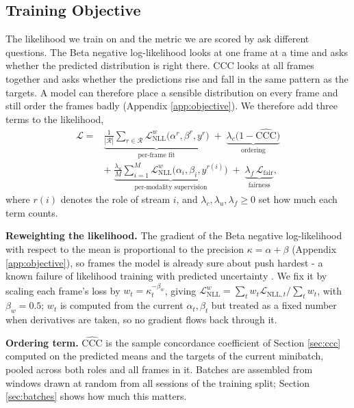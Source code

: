 \documentclass[10pt,a4paper,twocolumn]{article}
\begin{document}
	\subsection{Training Objective}
	\label{sec:objective}
	
	The likelihood we train on and the metric we are scored by ask different questions. The Beta negative log-likelihood looks at one frame at a time and asks whether the predicted distribution is right there. CCC looks at all frames together and asks whether the predictions rise and fall in the same pattern as the targets. A model can therefore place a sensible distribution on every frame and still order the frames badly (Appendix \ref{app:objective}). We therefore add three terms to the likelihood,
	$$\begin{aligned}\mathcal{L} = {}&\underbrace{\frac{1}{|\mathcal{R}|}\sum_{r \in \mathcal{R}} \mathcal{L}_{\text{NLL}}^{w}\bigl(\alpha^{r}, \beta^{r}, y^{r}\bigr)}_{\text{per-frame fit}} \;+\; \underbrace{\lambda_c\bigl(1 - \widehat{\text{CCC}}\bigr)}_{\text{ordering}} \\ &+\; \underbrace{\frac{\lambda_u}{M}\sum_{i=1}^{M} \mathcal{L}_{\text{NLL}}^{w}\bigl(\alpha_i, \beta_i, y^{r(i)}\bigr)}_{\text{per-modality supervision}} \;+\; \underbrace{\lambda_f\,\mathcal{L}_{\text{fair}}}_{\text{fairness}},\end{aligned}$$
	where $r(i)$ denotes the role of stream $i$, and $\lambda_c, \lambda_u, \lambda_f \ge 0$ set how much each term counts.
	
	\textbf{Reweighting the likelihood.} The gradient of the Beta negative log-likelihood with respect to the mean is proportional to the precision $\kappa = \alpha+\beta$ (Appendix \ref{app:objective}), so frames the model is already sure about push hardest - a known failure of likelihood training with predicted uncertainty \cite{seitzer2022}. We fix it by scaling each frame's loss by $w_t = \kappa_t^{-\beta_w}$, giving $\mathcal{L}_{\text{NLL}}^{w} = \sum_t w_t \mathcal{L}_{\text{NLL},t} / \sum_t w_t$, with $\beta_w = 0.5$; $w_t$ is computed from the current $\alpha_t, \beta_t$ but treated as a fixed number when derivatives are taken, so no gradient flows back through it.
	
	\textbf{Ordering term.} $\widehat{\text{CCC}}$ is the sample concordance coefficient of Section \ref{sec:ccc} computed on the predicted means and the targets of the current minibatch, pooled across both roles and all frames in it. Batches are assembled from windows drawn at random from all sessions of the training split; Section \ref{sec:batches} shows how much this matters.
	
\end{document}
